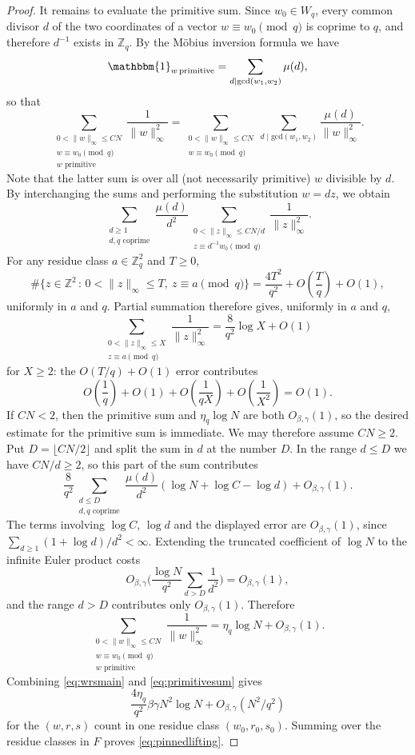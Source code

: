 \documentclass[10pt,a4paper]{amsart}
\numberwithin{equation}{section}
\newcommand{\norm}[1]{\lVert #1\rVert_\infty}
\renewcommand{\leq}{\leqslant}
\renewcommand{\le}{\leqslant}
\renewcommand{\geq}{\geqslant}
\renewcommand{\ge}{\geqslant}
\begin{document}
\begin{proof}
It remains to evaluate the primitive sum. Since $w_0\in W_q$, every common divisor $d$ of the two coordinates of a vector $w\equiv w_0\pmod q$ is coprime to $q$, and therefore $d^{-1}$ exists in $\mathbb{Z}_{q}$. By the M\"{o}bius inversion formula we have
\[ \mathbbm{1}_{w\,\mathrm{primitive}} = \sum_{d\mid \mathrm{gcd}(w_1,w_2)}\mu(d), \]
so that
\[ \sum_{\substack{0<\norm{w}\le CN\\ w\equiv w_0\!\!\!\pmod q \\ w\text{ primitive}}} \frac1{\norm{w}^2}
= \sum_{\substack{0<\norm{w}\leq CN\\ w\equiv w_0\!\!\!\pmod q}}\sum_{d\mid \mathrm{gcd}(w_1,w_2)}
\frac{\mu(d)}{\norm{w}^{2}}. \]
Note that the latter sum is over all (not necessarily primitive) $w$ divisible by $d$. By interchanging the sums and performing the substitution $w=dz$, we obtain
\[ \sum_{\substack{d\ge1\\d,q\text{ coprime}}}\frac{\mu(d)}{d^2} \sum_{\substack{0<\norm{z}\le CN/d\\ z\equiv d^{-1}w_0\!\!\!\pmod q}} \frac1{\norm{z}^2}. \]
For any residue class $a\in\mathbb{Z}_q^2$ and $T\ge0$,
\[ \#\{z\in\mathbb{Z}^2 \,:\, 0<\norm{z}\le T, \ z\equiv a\!\!\!\pmod q\}
=\frac{4T^2}{q^2}+O\left(\frac{T}{q}\right)+O(1), \]
uniformly in $a$ and $q$. Partial summation therefore gives, uniformly in $a$ and $q$,
\[ \sum_{\substack{0<\norm{z}\le X\\ z\equiv a \!\!\!\pmod q}} \frac1{\norm{z}^2}
= \frac8{q^2}\log X+O(1) \]
for $X\ge2$: the $O(T/q)+O(1)$ error contributes
\[ O\left(\frac1q\right)+O(1)+O\left(\frac1{qX}\right)+O\left(\frac1{X^2}\right)=O(1). \]
If $CN<2$, then the primitive sum and $\eta_q\log N$ are both $O_{\beta,\gamma}(1)$, so the desired estimate for the primitive sum is immediate. We may therefore assume $CN\ge2$. Put $D=\lfloor CN/2\rfloor$ and split the sum in $d$ at the number $D$.
In the range $d\le D$ we have $CN/d\ge2$, so this part of the sum contributes
\[ \frac8{q^2} \sum_{\substack{d\le D\\d,q\text{ coprime}}}\frac{\mu(d)}{d^2} (\log N+\log C-\log d)+O_{\beta,\gamma}(1). \]
The terms involving $\log C$, $\log d$ and the displayed error are $O_{\beta,\gamma}(1)$, since $\sum_{d\geq1}(1+\log d)/d^2<\infty$. Extending the truncated coefficient of $\log N$ to the infinite Euler product costs
\[ O_{\beta,\gamma}\biggl(\frac{\log N}{q^2}\sum_{d>D}\frac1{d^2}\biggr)=O_{\beta,\gamma}(1), \]
and the range $d>D$ contributes only $O_{\beta,\gamma}(1)$. Therefore
\begin{equation}\label{eq:primitivesum}
\sum_{\substack{0<\norm{w}\le CN\\ w\equiv w_0\!\!\!\pmod q\\ w\text{ primitive}}} \frac1{\norm{w}^2}
=\eta_q\log N+O_{\beta,\gamma}(1).
\end{equation}
Combining \eqref{eq:wrsmain} and \eqref{eq:primitivesum} gives
\[ \frac{4\eta_q}{q^2}\beta\gamma N^2\log N + O_{\beta,\gamma}(N^2/q^2) \]
for the $(w,r,s)$ count in one residue class $(w_0,r_0,s_0)$. Summing over the residue classes in $F$ proves \eqref{eq:pinnedlifting}.


\end{proof}
\end{document}
